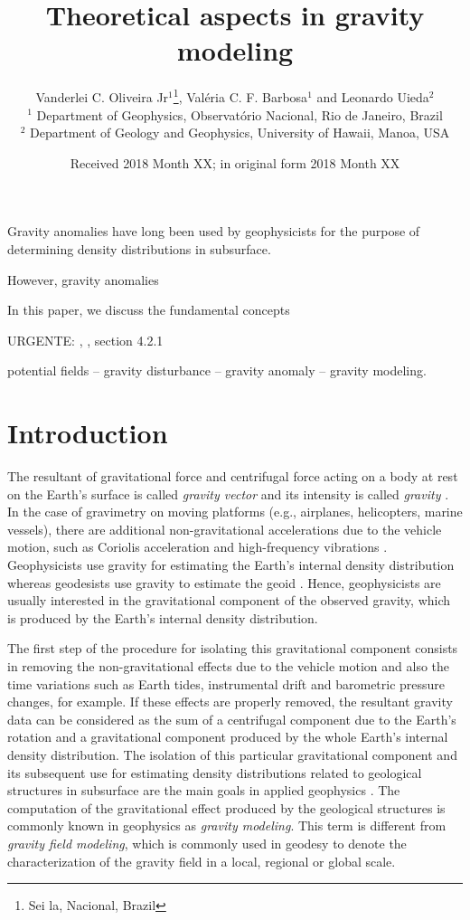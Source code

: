 \documentclass[extra]{gji}
\title[Theoretical aspects in gravity modeling]
      {Theoretical aspects in gravity modeling}
\author[Oliveira Jr, Barbosa and Uieda]
{Vanderlei C. Oliveira Jr$^1$\thanks{Sei la, Nacional, Brazil}, Val\'{e}ria C. F. Barbosa$^1$ and Leonardo Uieda$^2$ \\
	$^1$ Department of Geophysics, Observat\'{o}rio Nacional, Rio de Janeiro, Brazil \\
	$^2$ Department of Geology and Geophysics, University of Hawaii, Manoa, USA
}
\date{Received 2018 Month XX; in original form 2018 Month XX}
\begin{document}
\label{firstpage}

\maketitle


\begin{summary}
 Gravity anomalies have long been used by geophysicists for the 
 purpose of determining density distributions in subsurface.
 
 However, gravity anomalies 
 
 In this paper, we discuss the fundamental concepts 
 
 URGENTE: \citep{marussi1974}, \citep{torge2012}, section 4.2.1
\end{summary}

\begin{keywords}
 potential fields -- gravity disturbance -- gravity anomaly -- gravity modeling.
\end{keywords}


\section{Introduction}

The resultant of gravitational force and centrifugal force acting 
on a body at rest on the Earth's surface is called 
\textit{gravity vector} and its intensity is called 
\textit{gravity} \citep{heiskanen-moritz1967,
hofmann-wellenhof-moritz2005}.
In the case of gravimetry on moving platforms (e.g., airplanes,
helicopters, marine vessels), there are additional
non-gravitational accelerations due to the vehicle motion, 
such as Coriolis acceleration and high-frequency vibrations 
\citep{glennie-etal2000,nabighian-etal2005-grav,baumann-etal2012}.
Geophysicists use gravity for estimating the Earth's 
internal density distribution whereas geodesists use
gravity to estimate the geoid \citep{li2001}.
Hence, geophysicists are usually interested 
in the gravitational component of the observed gravity, 
which is produced by the Earth's internal 
density distribution.

The first step of the procedure for isolating this 
gravitational component consists in removing the non-gravitational 
effects due to the vehicle motion and also the time variations 
such as Earth tides, instrumental drift and barometric 
pressure changes, for example.
If these effects are properly removed, the resultant 
gravity data can be considered as the sum of a 
centrifugal component due to the Earth's rotation and
a gravitational component produced by the whole Earth's
internal density distribution.
The isolation of this particular gravitational component 
and its subsequent use for estimating density 
distributions related to geological structures in subsurface 
are the main goals in applied geophysics \citep{blakely1996}.
The computation of the gravitational effect produced by
the geological structures is commonly known in geophysics as 
\textit{gravity modeling}.
This term is different from \textit{gravity field modeling}, which
is commonly used in geodesy to denote the characterization of the 
gravity field in a local, regional or global scale.
\end{document}
